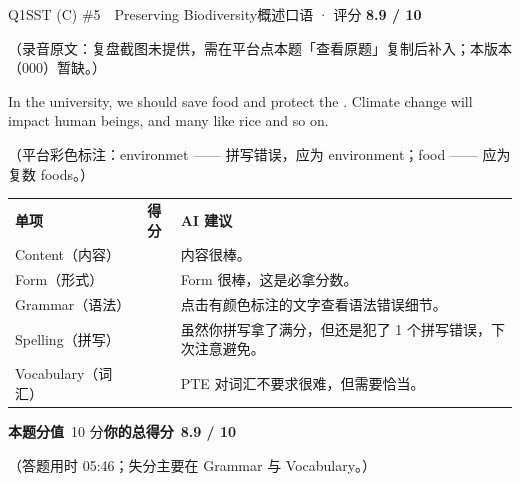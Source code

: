 \begin{qblock}{Q1\quad SST (C) \#5\ \ Preserving Biodiversity}{概述口语 · 评分 \textcolor{cAccent}{\bfseries 8.9 / 10}}
\begin{promptbox}
{\color{cWrong}（录音原文：复盘截图未提供，需在平台点本题「查看原题」复制后补入；本版本（000）暂缺。）}
\end{promptbox}
\begin{youbox}
In the university, we should save food and protect the . Climate change will impact human beings, and many  like rice and so on.
\end{youbox}
{\footnotesize\color{gray}（平台彩色标注：environmet —— 拼写错误，应为 environment；food —— 应为复数 foods。）}
\begin{notebox}
{\renewcommand{\arraystretch}{1.35}
\begin{tabularx}{\linewidth}{@{}l c Z@{}}
\textbf{单项} & \textbf{得分} & \textbf{AI 建议}\\[2pt]
Content（内容）&  & 内容很棒。\\
Form（形式）&  & Form 很棒，这是必拿分数。\\
Grammar（语法）&  & 点击有颜色标注的文字查看语法错误细节。\\
Spelling（拼写）&  & 虽然你拼写拿了满分，但还是犯了 1 个拼写错误，下次注意避免。\\
Vocabulary（词汇）&  & PTE 对词汇不要求很难，但需要恰当。\\
\end{tabularx}}
\smallskip
\textbf{本题分值}\ 10 分\qquad\textbf{你的总得分}\ \textcolor{cAccent}{\bfseries 8.9 / 10}
\end{notebox}
\smallskip
{\footnotesize\color{gray}（答题用时 05:46；失分主要在 Grammar 与 Vocabulary。）}
\end{qblock}

